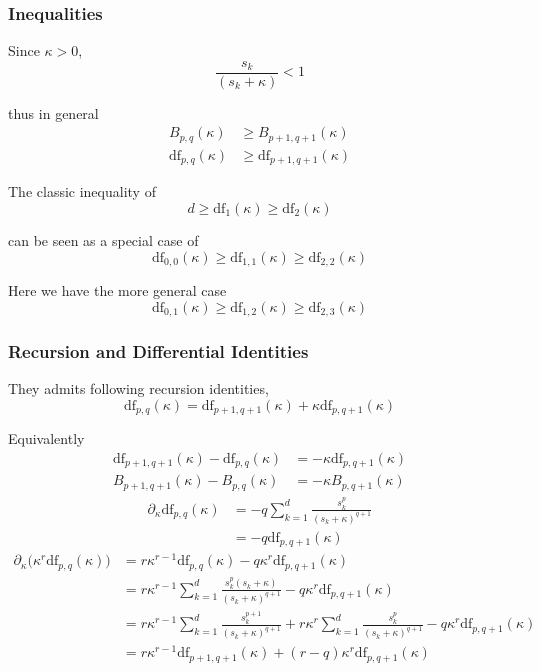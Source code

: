 \subsubsection{Inequalities}

Since $\kappa>0$,
\[
\frac{s_{k}}{(s_{k}+\kappa)}<1
\]

thus in general
\begin{align*}
B_{p,q}(\kappa) & \geq B_{p+1,q+1}(\kappa)\\
\mathrm{df}_{p,q}(\kappa) & \geq\mathrm{df}_{p+1,q+1}(\kappa)
\end{align*}

The classic inequality of
\[
d\geq\mathrm{df}_{1}(\kappa)\geq\mathrm{df}_{2}(\kappa)
\]

can be seen as a special case of
\[
\mathrm{df}_{0,0}(\kappa)\geq\mathrm{df}_{1,1}(\kappa)\geq\mathrm{df}_{2,2}(\kappa)
\]

Here we have the more general case
\[
\mathrm{df}_{0,1}(\kappa)\geq\mathrm{df}_{1,2}(\kappa)\geq\mathrm{df}_{2,3}(\kappa)
\]


\subsubsection{Recursion and Differential Identities}

They admits following recursion identities,
\[
\mathrm{df}_{p,q}(\kappa)=\mathrm{df}_{p+1,q+1}(\kappa)+\kappa\mathrm{df}_{p,q+1}(\kappa)
\]

Equivalently
\begin{align*}
\mathrm{df}_{p+1,q+1}(\kappa)-\mathrm{df}_{p,q}(\kappa) & =-\kappa\mathrm{df}_{p,q+1}(\kappa)\\
B_{p+1,q+1}(\kappa)-B_{p,q}(\kappa) & =-\kappa B_{p,q+1}(\kappa)
\end{align*}
\begin{align*}
\partial_{\kappa}\mathrm{df}_{p,q}(\kappa) & =-q\sum_{k=1}^{d}\frac{s_{k}^{p}}{(s_{k}+\kappa)^{q+1}}\\
 & =-q\mathrm{df}_{p,q+1}(\kappa)
\end{align*}
\begin{align*}
\partial_{\kappa}\big(\kappa^{r}\mathrm{df}_{p,q}(\kappa)\big) & =r\kappa^{r-1}\mathrm{df}_{p,q}(\kappa)-q\kappa^{r}\mathrm{df}_{p,q+1}(\kappa)\\
 & =r\kappa^{r-1}\sum_{k=1}^{d}\frac{s_{k}^{p}(s_{k}+\kappa)}{(s_{k}+\kappa)^{q+1}}-q\kappa^{r}\mathrm{df}_{p,q+1}(\kappa)\\
 & =r\kappa^{r-1}\sum_{k=1}^{d}\frac{s_{k}^{p+1}}{(s_{k}+\kappa)^{q+1}}+r\kappa^{r}\sum_{k=1}^{d}\frac{s_{k}^{p}}{(s_{k}+\kappa)^{q+1}}-q\kappa^{r}\mathrm{df}_{p,q+1}(\kappa)\\
 & =r\kappa^{r-1}\mathrm{df}_{p+1,q+1}(\kappa)+(r-q)\kappa^{r}\mathrm{df}_{p,q+1}(\kappa)
\end{align*}


\begingroup\color{red}
